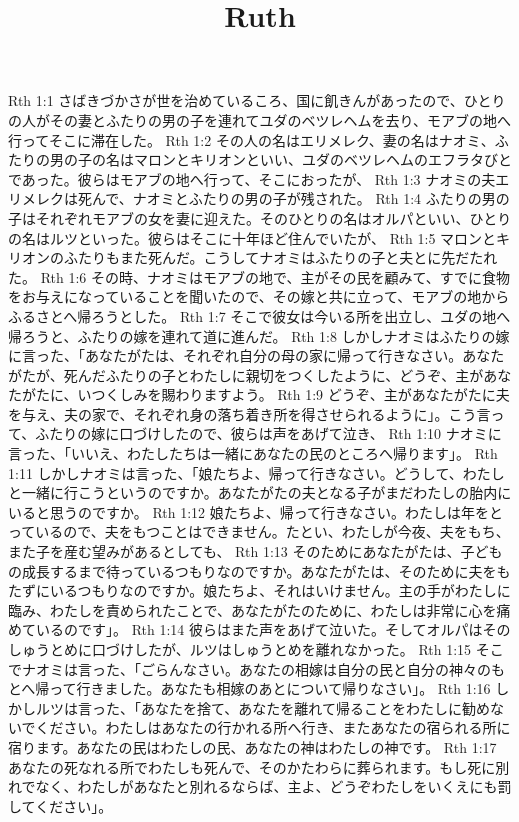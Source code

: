 

\title{Ruth}

Rth 1:1  さばきづかさが世を治めているころ、国に飢きんがあったので、ひとりの人がその妻とふたりの男の子を連れてユダのベツレヘムを去り、モアブの地へ行ってそこに滞在した。
Rth 1:2  その人の名はエリメレク、妻の名はナオミ、ふたりの男の子の名はマロンとキリオンといい、ユダのベツレヘムのエフラタびとであった。彼らはモアブの地へ行って、そこにおったが、
Rth 1:3  ナオミの夫エリメレクは死んで、ナオミとふたりの男の子が残された。
Rth 1:4  ふたりの男の子はそれぞれモアブの女を妻に迎えた。そのひとりの名はオルパといい、ひとりの名はルツといった。彼らはそこに十年ほど住んでいたが、
Rth 1:5  マロンとキリオンのふたりもまた死んだ。こうしてナオミはふたりの子と夫とに先だたれた。
Rth 1:6  その時、ナオミはモアブの地で、主がその民を顧みて、すでに食物をお与えになっていることを聞いたので、その嫁と共に立って、モアブの地からふるさとへ帰ろうとした。
Rth 1:7  そこで彼女は今いる所を出立し、ユダの地へ帰ろうと、ふたりの嫁を連れて道に進んだ。
Rth 1:8  しかしナオミはふたりの嫁に言った、「あなたがたは、それぞれ自分の母の家に帰って行きなさい。あなたがたが、死んだふたりの子とわたしに親切をつくしたように、どうぞ、主があなたがたに、いつくしみを賜わりますよう。
Rth 1:9  どうぞ、主があなたがたに夫を与え、夫の家で、それぞれ身の落ち着き所を得させられるように」。こう言って、ふたりの嫁に口づけしたので、彼らは声をあげて泣き、
Rth 1:10  ナオミに言った、「いいえ、わたしたちは一緒にあなたの民のところへ帰ります」。
Rth 1:11  しかしナオミは言った、「娘たちよ、帰って行きなさい。どうして、わたしと一緒に行こうというのですか。あなたがたの夫となる子がまだわたしの胎内にいると思うのですか。
Rth 1:12  娘たちよ、帰って行きなさい。わたしは年をとっているので、夫をもつことはできません。たとい、わたしが今夜、夫をもち、また子を産む望みがあるとしても、
Rth 1:13  そのためにあなたがたは、子どもの成長するまで待っているつもりなのですか。あなたがたは、そのために夫をもたずにいるつもりなのですか。娘たちよ、それはいけません。主の手がわたしに臨み、わたしを責められたことで、あなたがたのために、わたしは非常に心を痛めているのです」。
Rth 1:14  彼らはまた声をあげて泣いた。そしてオルパはそのしゅうとめに口づけしたが、ルツはしゅうとめを離れなかった。
Rth 1:15  そこでナオミは言った、「ごらんなさい。あなたの相嫁は自分の民と自分の神々のもとへ帰って行きました。あなたも相嫁のあとについて帰りなさい」。
Rth 1:16  しかしルツは言った、「あなたを捨て、あなたを離れて帰ることをわたしに勧めないでください。わたしはあなたの行かれる所へ行き、またあなたの宿られる所に宿ります。あなたの民はわたしの民、あなたの神はわたしの神です。
Rth 1:17  あなたの死なれる所でわたしも死んで、そのかたわらに葬られます。もし死に別れでなく、わたしがあなたと別れるならば、主よ、どうぞわたしをいくえにも罰してください」。
